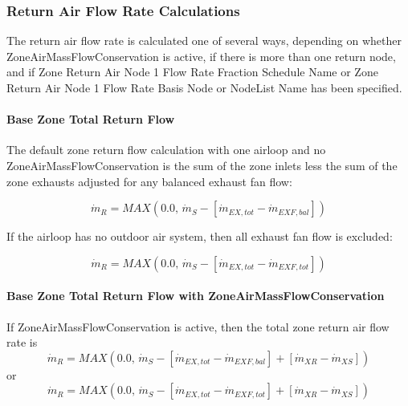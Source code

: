 \subsubsection{Return Air Flow Rate Calculations}\label{return-air-flow-rate-calculations}

The return air flow rate is calculated one of several ways, depending on whether ZoneAirMassFlowConservation is active, if there is more than one return node, and if Zone Return Air Node 1 Flow Rate Fraction Schedule Name or Zone Return Air Node 1 Flow Rate Basis Node or NodeList Name has been specified.


\paragraph{Base Zone Total Return Flow}\label{base-zone-total-return-flow}

The default zone return flow calculation with one airloop and no ZoneAirMassFlowConservation is the sum of the zone inlets less the sum of the zone exhausts adjusted for any balanced exhaust fan flow:

\begin{equation}
{\dot m_{R}} = MAX\left( {0.0,\,{{\dot m}_S} - [{{\dot m}_{EX,tot}} - {\dot m_{EXF,bal}}]} \right)
\end{equation}

If the airloop has no outdoor air system, then all exhaust fan flow is excluded:

\begin{equation}
{\dot m_{R}} = MAX\left( {0.0,\,{{\dot m}_S} - [{{\dot m}_{EX,tot}} - {\dot m_{EXF,tot}}]} \right)
\end{equation}

\paragraph{Base Zone Total Return Flow with ZoneAirMassFlowConservation}\label{base-zone-total-return-flow-with-masscons}

If ZoneAirMassFlowConservation is active, then the total zone return air flow rate is 
\begin{equation}
{\dot m_{R}} = MAX\left( {0.0,\,{{\dot m}_S} - [{{\dot m}_{EX,tot}} - {\dot m_{EXF,bal}}] + [{{\dot m}_{XR}} - {{\dot m}_{XS}}]} \right)
\end{equation}
or
\begin{equation}
{\dot m_{R}} = MAX\left( {0.0,\,{{\dot m}_S} - [{{\dot m}_{EX,tot}} - {\dot m_{EXF,tot}}] + [{{\dot m}_{XR}} - {{\dot m}_{XS}}]} \right)
\end{equation}


